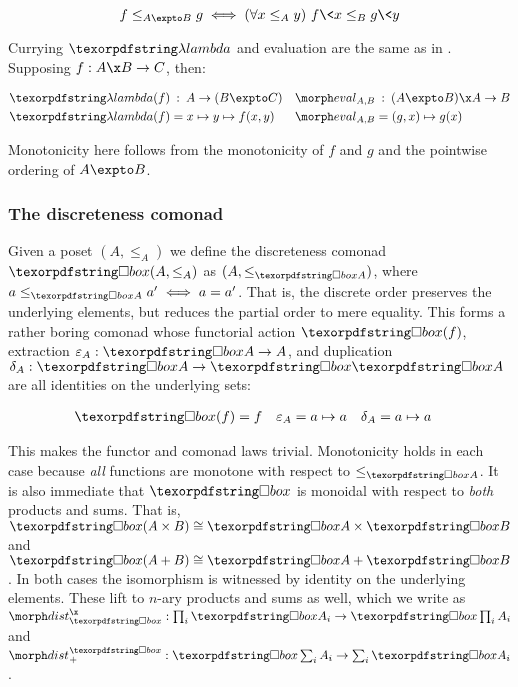 \[ f \le_{A \expto B} g \iff \fa{x \le_A y} f\<x \le_B g\<y \]

\noindent
Currying $\fn$ and evaluation are the same as in \Set. Supposing $f : A \x B \to
C$, then:

\begin{align*}
  \fn(f) &\isa A \to (B \expto C) &
  \eval_{A,B} &\isa (A \expto B) \x A \to B
  \\
  \fn(f) &= x \mapsto y \mapsto f(x,y) &
  \eval_{A,B} &= (g,x) \mapsto g(x)
\end{align*}

\noindent
Monotonicity here follows from the monotonicity of $f$ and $g$ and the pointwise
ordering of $A \expto B$.


\subsubsection{The discreteness comonad}

Given a poset $(A, \le_A)$ we define the discreteness comonad $\iso(A, \le_A)$
as $(A, \le_{\iso A})$, where \( a \le_{\iso A} a' \iff a = a' \).
%
That is, the discrete order preserves the underlying elements, but reduces the
partial order to mere equality.
%
This forms a rather boring comonad whose functorial action $\iso(f)$, extraction $\varepsilon_A : \iso A \to A$, and duplication $\delta_A : \iso A \to \iso \iso A$ are all identities on the underlying sets:

\begin{align*}
  \iso(f) &= f & \varepsilon_A &= a \mapsto a & \delta_A &= a \mapsto a
\end{align*}

\noindent
This makes the functor and comonad laws trivial. Monotonicity holds in each case because \emph{all} functions are monotone with respect to $\le_{\iso A}$.
%
It is also immediate that $\iso$ is monoidal with respect to \emph{both}
products and sums. That is, $\iso (A \times B) \cong \iso A \times \iso B$
and $\iso (A + B) \cong \iso A + \iso B$.
%
In both cases the isomorphism is witnessed by identity on the underlying
elements.
%
These lift to $n$-ary products and sums as well, which we write as $\isox : \prod_i \iso A_i \to \iso\prod_i A_i$ and $\isosum : \iso \sum_i
A_i \to \sum_i \iso A_i$.

